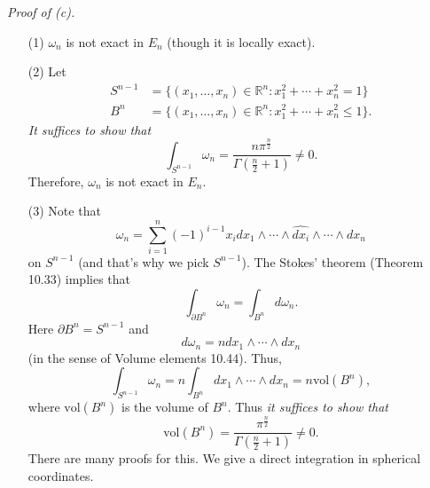 \documentclass{article}
\begin{document}



\emph{Proof of (c).}
\begin{enumerate}
\item[(1)]
  $\omega_n$ is not exact in $E_n$ (though it is locally exact).

\item[(2)]
  Let
  \begin{align*}
    S^{n-1}
    &= \{ (x_1,\ldots,x_n) \in \mathbb{R}^n : x_1^2+\cdots+x_n^2 = 1 \} \\
    B^{n}
    &= \{ (x_1,\ldots,x_n) \in \mathbb{R}^n : x_1^2+\cdots+x_n^2 \leq 1 \}.
  \end{align*}
  \emph{It suffices to show that}
  \[
    \int_{S^{n-1}} \omega_n
    = \frac{n \pi^{\frac{n}{2}}}{\Gamma\left(\frac{n}{2}+1\right)} \neq 0.
  \]
  Therefore, $\omega_n$ is not exact in $E_n$.

\item[(3)]
  Note that
  \[
    \omega_n
    = \sum_{i=1}^{n} (-1)^{i-1} x_i
    dx_1 \wedge \cdots \wedge \widehat{dx_i} \wedge \cdots \wedge dx_{n}
  \]
  on $S^{n-1}$ (and that's why we pick $S^{n-1}$).
  The Stokes' theorem (Theorem 10.33) implies that
  \[
    \int_{\partial B^{n}} \omega_n = \int_{B^{n}} d\omega_n.
  \]
  Here $\partial B^{n} = S^{n-1}$ and
  \[
    d\omega_n
    = n dx_1 \wedge \cdots \wedge dx_n
  \]
  (in the sense of Volume elements 10.44).
  Thus,
  \[
    \int_{S^{n-1}} \omega_n
    = n \int_{B^{n}} dx_1 \wedge \cdots \wedge dx_n
    = n \mathrm{vol}(B^n),
  \]
  where $\mathrm{vol}(B^n)$ is the volume of $B^n$.
  Thus
  \emph{it suffices to show that}
  \[
    \mathrm{vol}(B^n) = \frac{\pi^{\frac{n}{2}}}{\Gamma\left(\frac{n}{2}+1\right)} \neq 0.
  \]
  There are many proofs for this.
  We give a direct integration in spherical coordinates.


\end{enumerate}
\end{document}
